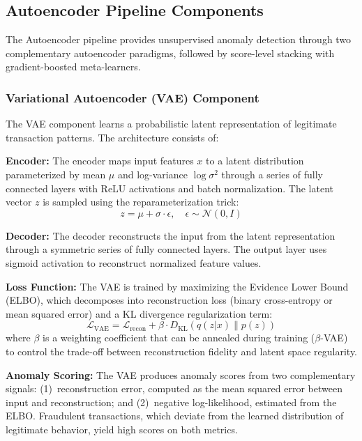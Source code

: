 \subsection{Autoencoder Pipeline Components}

The Autoencoder pipeline provides unsupervised anomaly detection through two complementary autoencoder paradigms, followed by score-level stacking with gradient-boosted meta-learners.

\subsubsection{Variational Autoencoder (VAE) Component}

The VAE component learns a probabilistic latent representation of legitimate transaction patterns. The architecture consists of:

\textbf{Encoder:} The encoder maps input features $x$ to a latent distribution parameterized by mean $\mu$ and log-variance $\log \sigma^2$ through a series of fully connected layers with ReLU activations and batch normalization. The latent vector $z$ is sampled using the reparameterization trick:
\begin{equation}
z = \mu + \sigma \cdot \epsilon, \quad \epsilon \sim \mathcal{N}(0, I)
\label{eq:vae-reparameterization}
\end{equation}

\textbf{Decoder:} The decoder reconstructs the input from the latent representation through a symmetric series of fully connected layers. The output layer uses sigmoid activation to reconstruct normalized feature values.

\textbf{Loss Function:} The VAE is trained by maximizing the Evidence Lower Bound (ELBO), which decomposes into reconstruction loss (binary cross-entropy or mean squared error) and a KL divergence regularization term:
\begin{equation}
\mathcal{L}_{\text{VAE}} = \mathcal{L}_{\text{recon}} + \beta \cdot D_{\text{KL}}(q(z|x) \| p(z))
\label{eq:vae-loss}
\end{equation}
where $\beta$ is a weighting coefficient that can be annealed during training ($\beta$-VAE) to control the trade-off between reconstruction fidelity and latent space regularity.

\textbf{Anomaly Scoring:} The VAE produces anomaly scores from two complementary signals: (1)~reconstruction error, computed as the mean squared error between input and reconstruction; and (2)~negative log-likelihood, estimated from the ELBO. Fraudulent transactions, which deviate from the learned distribution of legitimate behavior, yield high scores on both metrics.

